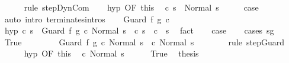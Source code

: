 \begin{isabellebody}
\ \ \ \ \isamarkupfalse%
\ {\isacharparenleft}rule\ step{\isachardot}DynCom{\isacharparenright}\isanewline
\ \ \isamarkupfalse%
\ hyp\ {\isacharbrackleft}OF\ this{\isacharbrackright}\ \isamarkupfalse%
\ {\isachardoublequoteopen}{\isasymGamma}{\isasymturnstile}c\ s\ {\isasymdown}\ Normal\ s{\isachardoublequoteclose}\isacommand{{\isachardot}}\isamarkupfalse%
\isanewline
\ \ \isamarkupfalse%
\ \isamarkupfalse%
\ {\isacharquery}case\isanewline
\ \ \ \ \isamarkupfalse%
\ {\isacharparenleft}auto\ intro{\isacharcolon}\ terminates{\isachardot}intros{\isacharparenright}\isanewline
{}\isamarkupfalse%
\isanewline
\ \ \isamarkupfalse%
\ {\isacharparenleft}Guard\ f\ g\ c{\isacharparenright}\isanewline
\ \ \isamarkupfalse%
\ hyp{\isacharcolon}\ {\isachardoublequoteopen}{\isasymAnd}c{\isacharprime}\ s{\isacharprime}{\isachardot}\ {\isasymGamma}{\isasymturnstile}\ {\isacharparenleft}Guard\ f\ g\ c{\isacharcomma}\ Normal\ s{\isacharparenright}\ {\isasymrightarrow}\ {\isacharparenleft}c{\isacharprime}{\isacharcomma}\ s{\isacharprime}{\isacharparenright}\ {\isasymLongrightarrow}\ {\isasymGamma}{\isasymturnstile}c{\isacharprime}\ {\isasymdown}\ s{\isacharprime}{\isachardoublequoteclose}\ \isamarkupfalse%
\ fact\isanewline
\ \ \isamarkupfalse%
\ {\isacharquery}case\isanewline
\ \ \isamarkupfalse%
\ {\isacharparenleft}cases\ {\isachardoublequoteopen}s{\isasymin}g{\isachardoublequoteclose}{\isacharparenright}\isanewline
\ \ \ \ \isamarkupfalse%
\ True\isanewline
\ \ \ \ \isamarkupfalse%
\ \isamarkupfalse%
\ {\isachardoublequoteopen}{\isasymGamma}{\isasymturnstile}\ {\isacharparenleft}Guard\ f\ g\ c{\isacharcomma}\ Normal\ s{\isacharparenright}\ {\isasymrightarrow}\ {\isacharparenleft}c{\isacharcomma}\ Normal\ s{\isacharparenright}{\isachardoublequoteclose}\isanewline
\ \ \ \ \ \ \isamarkupfalse%
\ {\isacharparenleft}rule\ step{\isachardot}Guard{\isacharparenright}\isanewline
\ \ \ \ \isamarkupfalse%
\ hyp\ {\isacharbrackleft}OF\ this{\isacharbrackright}\ \isamarkupfalse%
\ {\isachardoublequoteopen}{\isasymGamma}{\isasymturnstile}c{\isasymdown}\ Normal\ s{\isachardoublequoteclose}\isacommand{{\isachardot}}\isamarkupfalse%
\isanewline
\ \ \ \ \isamarkupfalse%
\ True\ \isamarkupfalse%
\ {\isacharquery}thesis\isanewline
\ \ \ \ \ \ \isamarkupfalse%

\end{isabellebody}
